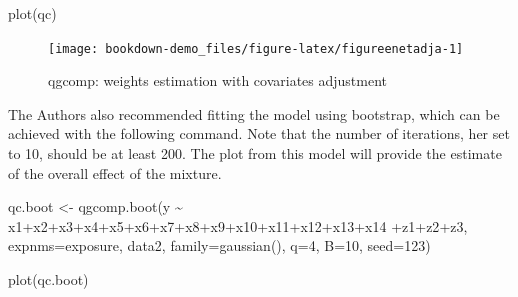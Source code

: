 \documentclass[
]{book}
\newenvironment{Shaded}{\begin{snugshade}}{\end{snugshade}}
\newcommand{\AttributeTok}[1]{\textcolor[rgb]{0.77,0.63,0.00}{#1}}
\newcommand{\DecValTok}[1]{\textcolor[rgb]{0.00,0.00,0.81}{#1}}
\newcommand{\FunctionTok}[1]{\textcolor[rgb]{0.00,0.00,0.00}{#1}}
\newcommand{\NormalTok}[1]{#1}
\newcommand{\OtherTok}[1]{\textcolor[rgb]{0.56,0.35,0.01}{#1}}
\newcommand{\SpecialCharTok}[1]{\textcolor[rgb]{0.00,0.00,0.00}{#1}}
\begin{document}
\begin{Shaded}
\begin{Highlighting}[]
\FunctionTok{plot}\NormalTok{(qc)}
\end{Highlighting}
\end{Shaded}

\begin{figure}[H]

{\centering \texttt{[image: bookdown-demo\_files/figure-latex/figureenetadja-1]} 

}

\caption{qgcomp: weights estimation with covariates adjustment}\label{fig:figureenetadja}
\end{figure}

The Authors also recommended fitting the model using bootstrap, which can be achieved with the following command. Note that the number of iterations, her set to 10, should be at least 200. The plot from this model will provide the estimate of the overall effect of the mixture.

\begin{Shaded}
\begin{Highlighting}[]
\NormalTok{qc.boot }\OtherTok{\textless{}{-}} \FunctionTok{qgcomp.boot}\NormalTok{(y }\SpecialCharTok{\textasciitilde{}}\NormalTok{ x1}\SpecialCharTok{+}\NormalTok{x2}\SpecialCharTok{+}\NormalTok{x3}\SpecialCharTok{+}\NormalTok{x4}\SpecialCharTok{+}\NormalTok{x5}\SpecialCharTok{+}\NormalTok{x6}\SpecialCharTok{+}\NormalTok{x7}\SpecialCharTok{+}\NormalTok{x8}\SpecialCharTok{+}\NormalTok{x9}\SpecialCharTok{+}\NormalTok{x10}\SpecialCharTok{+}\NormalTok{x11}\SpecialCharTok{+}\NormalTok{x12}\SpecialCharTok{+}\NormalTok{x13}\SpecialCharTok{+}\NormalTok{x14}
                         \SpecialCharTok{+}\NormalTok{z1}\SpecialCharTok{+}\NormalTok{z2}\SpecialCharTok{+}\NormalTok{z3,}
                         \AttributeTok{expnms=}\NormalTok{exposure,}
\NormalTok{                         data2, }\AttributeTok{family=}\FunctionTok{gaussian}\NormalTok{(), }\AttributeTok{q=}\DecValTok{4}\NormalTok{, }\AttributeTok{B=}\DecValTok{10}\NormalTok{, }\AttributeTok{seed=}\DecValTok{123}\NormalTok{)}
\end{Highlighting}
\end{Shaded}

\begin{Shaded}
\begin{Highlighting}[]
\FunctionTok{plot}\NormalTok{(qc.boot)}
\end{Highlighting}
\end{Shaded}
\end{document}
